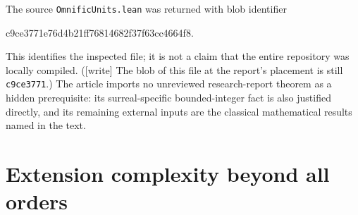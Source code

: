 \documentclass[11pt,a4paper]{article}
\numberwithin{equation}{section}
\theoremstyle{plain}
\newcommand{\wtag}{\textup{[write]}}%
\begin{document}
The source \texttt{OmnificUnits.lean} was returned with blob identifier
\begin{center}\small\ttfamily
c9ce3771e76d4b21ff76814682f37f63cc4664f8.
\end{center}
This identifies the inspected file; it is not a claim that the entire
repository was locally compiled. (\wtag{} The blob of this file at the
report's placement is still \texttt{c9ce3771}.) The article imports no unreviewed
research-report theorem as a hidden prerequisite: its surreal-specific
bounded-integer fact is also justified directly, and its remaining
external inputs are the classical mathematical results named in the text.


\part{Extension complexity beyond all orders}\label{poly:part:ic}
\end{document}
